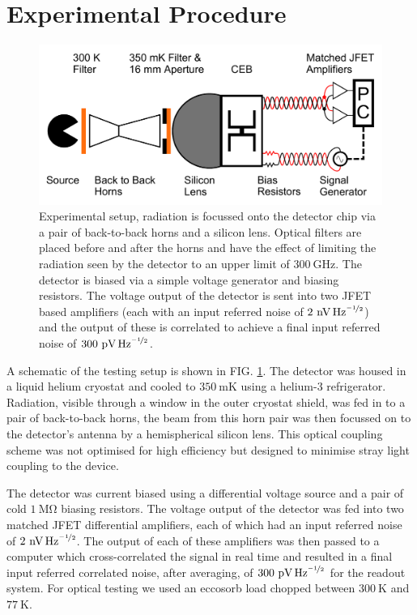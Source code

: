 \documentclass[aip, apl, a4paper, amsmath,amssymb, reprint]{revtex4-1}
\begin{document}
\section{Experimental Procedure}\label{sec:exp_procedure}
\begin{figure}[ht]
\includegraphics[width = 0.8\columnwidth]{experimental_setup}
\caption{Experimental setup, radiation is focussed onto the detector chip via a pair of back-to-back horns and a silicon lens. Optical filters are placed before and after the horns and have the effect of limiting the radiation seen by the detector to an upper limit of $300~\mathrm{GHz}$. The detector is biased via a simple voltage generator and biasing resistors. The voltage output of the detector is sent into two JFET based amplifiers (each with an input referred noise of $2~\mathrm{\mbox{nV\,Hz}^{\nicefrac{-1}{2}}}$) and the output of these is correlated to achieve a final input referred noise of $300~\mathrm{\mbox{pV\,Hz}^{\nicefrac{-1}{2}}}$.}
\label{fig:exp_setup}
\end{figure}

A schematic of the testing setup is shown in FIG. \ref{fig:exp_setup}. The detector was housed in a liquid helium cryostat and cooled to $350~\mathrm{mK}$ using a helium-3 refrigerator. Radiation, visible through a window in the outer cryostat shield, was fed in to a pair of back-to-back horns, the beam from this horn pair was then focussed on to the detector's antenna by a hemispherical silicon lens. This optical coupling scheme was not optimised for high efficiency but designed to minimise stray light coupling to the device.

The detector was current biased using a differential voltage source and a pair of cold $1~\mathrm{M\Omega}$ biasing resistors. The voltage output of the detector was fed into two matched JFET differential amplifiers, each of which had an input referred noise of $2~\mathrm{\mbox{nV\,Hz}^{\nicefrac{-1}{2}}}$. The output of each of these amplifiers was then passed to a computer which cross-correlated the signal in real time and resulted in a final input referred correlated noise, after averaging, of $300~\mathrm{\mbox{pV\,Hz}^{\nicefrac{-1}{2}}}$ for the readout system. For optical testing we used an eccosorb load chopped between $ 300~\mathrm{K}$ and $77~\mathrm{K}$.
\end{document}
